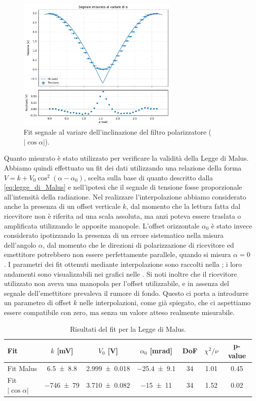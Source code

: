 \documentclass[a4paper]{article}
\begin{document}
\begin{figure}[htbp]
	\centering
	\includegraphics[width=0.7\textwidth]{grafici/abs_cos.pdf}
	\caption{Fit segnale al variare dell'inclinazione del filtro polarizzatore ($|\cos \alpha|$).}
	\label{fig:modulo_coseno}
\end{figure}

Quanto misurato è stato utilizzato per verificare la validità della Legge di Malus. 
Abbiamo quindi effettuato un fit dei dati utilizzando una relazione della forma $V = k+V_0\cos^2(\alpha - \alpha_0)$, 
scelta sulla base di quanto descritto dalla \cref{eq:legge_di_Malus} e nell'ipotesi che il segnale di tensione fosse proporzionale all'intensità della radiazione. 
Nel realizzare l'interpolazione abbiamo considerato anche la presenza di un offset verticale $k$, dal momento che la lettura fatta dal ricevitore non è riferita ad una scala assoluta, 
ma anzi poteva essere traslata o amplificata utilizzando le apposite manopole. 
L'offset orizzontale $\alpha_0$ è stato invece considerato ipotizzando la presenza di un errore sistematico nella misura dell'angolo $\alpha$,
dal momento che le direzioni di polarizzazione di ricevitore ed emettitore potrebbero non essere perfettamente parallele, quando si misura $\alpha = 0$.
I parametri dei fit ottenuti mediante interpolazione sono raccolti nella ; i loro andamenti sono visualizzabili nei grafici nelle . Si noti inoltre che il ricevitore utilizzato non aveva una manopola per l'offset utilizzabile, e in assenza del segnale dell'emettitore prevaleva il rumore di fondo. Questo ci porta a introdurre un parametro di offset $k$ nelle interpolazioni, come già spiegato, che ci aspettiamo essere compatibile con zero, ma senza un valore atteso realmente misurabile.
\begin{table}[htbp]
\centering
\caption{Risultati del fit per la Legge di Malus.}
\label{tab:fit_Malus}
\begin{tabular}{|l|cccccc|}
\hline
Fit & $k$ [\si{\milli\volt}]& $V_0$ [\si{\volt}]& $\alpha_0$ [\si{\milli\radian}]& DoF & $\chi^2/\nu$ & p-value \\\hline\hline
Fit Malus & \num{6.5 \pm 8.8} & \num{2.999 \pm 0.018} & \num{-25.4 \pm 9.1} & 34 & 1.01 & 0.45 \\\hline
Fit $|\cos\alpha|$ & \num{-746 \pm 79} & \num{3.710 \pm 0.082} & \num{-15 \pm 11} & 34 & 1.52 & 0.02 \\\hline
\end{tabular}
\end{table}
\end{document}

